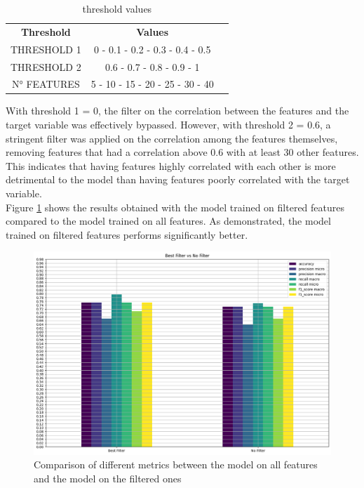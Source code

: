 \begin{table}[h]
    \centering
    \small
    \begin{tabular}{|c|c|c|}
        \hline
        \textbf{Threshold} & \textbf{Values}                 \\
        THRESHOLD 1        & 0 - 0.1 - 0.2 - 0.3 - 0.4 - 0.5 \\
        THRESHOLD 2        & 0.6 - 0.7 - 0.8 - 0.9 - 1       \\
        N° FEATURES        & 5 - 10 - 15 - 20 - 25 - 30 - 40 \\
        \hline
    \end{tabular}
    \caption{threshold values}
    \label{tab:threshold_values}
\end{table}
\noindent
With threshold 1 = 0, the filter on the correlation between the features and the target variable was effectively bypassed.
However, with threshold 2 = 0.6, a stringent filter was applied on the correlation among the features themselves,
removing features that had a correlation above 0.6 with at least 30 other features. This indicates that having features
highly correlated with each other is more detrimental to the model than having features poorly correlated with the target variable.\\
Figure \ref{fig:comparison_model_on_all_features_vs_model_on_best} shows the results obtained with the model trained on filtered features
compared to the model trained on all features. As demonstrated, the model trained on filtered features performs significantly better.

\begin{figure}[H]
    \centering
    \includegraphics[width=0.8\columnwidth]{../images/model_on_all_features_vs_model_on_best.png}
    \caption{Comparison of different metrics between the model on all features and the model on the filtered ones}
    \label{fig:comparison_model_on_all_features_vs_model_on_best}
\end{figure}

